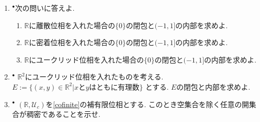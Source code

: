 \documentclass[dvipdfmx,a4paper,11pt]{article}
\newcommand{\R}{\mathbb{R}}
\theoremstyle{definition}
\begin{document}
\begin{enumerate}[label=\textbf{問}\ref*{sec-subspace}.\arabic*]
\setlength{\parskip}{0cm}
  \setlength{\itemsep}{7pt} 
\item $^\bullet$次の問いに答えよ.
\begin{enumerate}
\setlength{\parskip}{0cm}
  \setlength{\itemsep}{0pt} 
\item $\R$に離散位相を入れた場合の$\{ 0\}$の閉包と$(-1,1]$の内部を求めよ.
\item $\R$に密着位相を入れた場合の$\{ 0\}$の閉包と$(-1,1]$の内部を求めよ.
\item $\R$にユークリッド位相を入れた場合の$\{ 0\}$の閉包と$(-1,1]$の内部を求めよ.
\end{enumerate}




  


  \item $^\bullet$ $\R^2$にユークリッド位相を入れたものを考える. $E:= \{ (x,y)  \in \R^2| \text{$x$と$y$はともに有理数}\}$
とする. $E$の閉包と内部を求めよ. 

\item $^{\bullet}$ $(\R, \mathscr{U}_c)$を\ref{cofinite}の補有限位相とする. 
このとき空集合を除く任意の開集合が稠密であることを示せ.



\end{enumerate}
\end{document}
